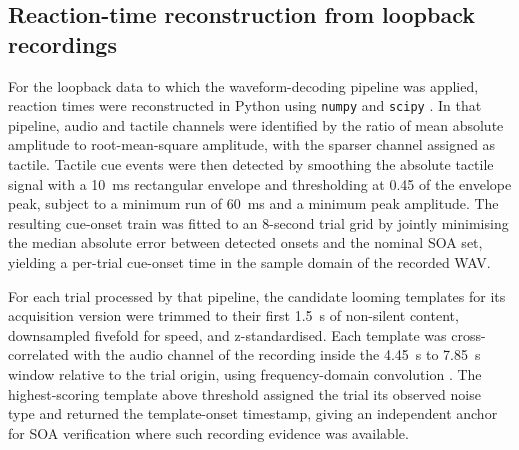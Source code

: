 \subsection{Reaction-time reconstruction from loopback recordings}

For the loopback data to which the waveform-decoding pipeline was applied, reaction times were reconstructed in Python using \texttt{numpy} and \texttt{scipy} \citep{Virtanen2020SciPy}. In that pipeline, audio and tactile channels were identified by the ratio of mean absolute amplitude to root-mean-square amplitude, with the sparser channel assigned as tactile. Tactile cue events were then detected by smoothing the absolute tactile signal with a 10~ms rectangular envelope and thresholding at 0.45 of the envelope peak, subject to a minimum run of 60~ms and a minimum peak amplitude. The resulting cue-onset train was fitted to an 8-second trial grid by jointly minimising the median absolute error between detected onsets and the nominal SOA set, yielding a per-trial cue-onset time in the sample domain of the recorded WAV.

For each trial processed by that pipeline, the candidate looming templates for its acquisition version were trimmed to their first 1.5~s of non-silent content, downsampled fivefold for speed, and z-standardised. Each template was cross-correlated with the audio channel of the recording inside the 4.45~s to 7.85~s window relative to the trial origin, using frequency-domain convolution \citep{Virtanen2020SciPy}. The highest-scoring template above threshold assigned the trial its observed noise type and returned the template-onset timestamp, giving an independent anchor for SOA verification where such recording evidence was available.


